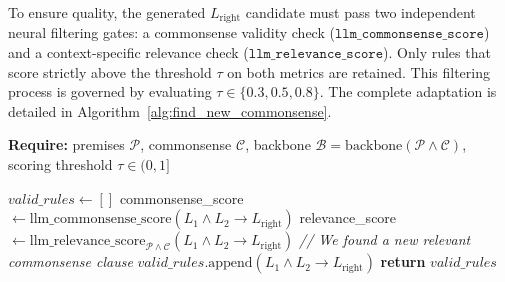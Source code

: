 To ensure quality, the generated $L_{\text{right}}$ candidate must pass two independent neural filtering gates: a commonsense validity check ($\texttt{llm\_commonsense\_score}$) and a context-specific relevance check ($\texttt{llm\_relevance\_score}$). Only rules that score strictly above the threshold $\tau$ on both metrics are retained. This filtering process is governed by evaluating $\tau \in \{0.3, 0.5, 0.8\}$. The complete adaptation is detailed in Algorithm~\ref{alg:find_new_commonsense}.

\begin{algorithm}[H]
\caption{}\label{alg:find_new_commonsense}
\textbf{Require:} premises $\mathcal{P}$, commonsense $\mathcal{C}$, backbone $\mathcal{B} = \text{backbone}(\mathcal{P} \land \mathcal{C})$, scoring threshold $\tau \in (0, 1]$
\begin{algorithmic}[1]
\State $valid\_rules \leftarrow []$
            \State commonsense\_score $\leftarrow \text{llm\_commonsense\_score}(L_1 \land L_2 \rightarrow L_{\text{right}})$
            \State relevance\_score $\leftarrow \text{llm\_relevance\_score}_{\mathcal{P} \land \mathcal{C}}(L_1 \land L_2 \rightarrow L_{\text{right}})$
                \State \textit{// We found a new relevant commonsense clause}
                \State $valid\_rules\text{.append}(L_1 \land L_2 \rightarrow L_{\text{right}})$
            \EndIf
        \EndFor
    \EndFor
\EndFor
\State \textbf{return} $valid\_rules$
\end{algorithmic}
\end{algorithm}

